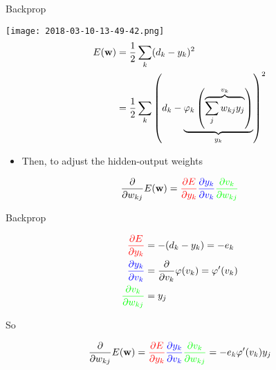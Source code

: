 \documentclass[notes]{beamer}
\providecommand{\tightlist}{%
  \setlength{\itemsep}{0pt}\setlength{\parskip}{0pt}}
\begin{document}
\begin{frame}{Backprop}

\centering 

\texttt{[image: 2018-03-10-13-49-42.png]}\\

\begin{align} 
    E(\vw) & = \frac{1}{2} \sum_k (d_k - y_k)^2 \\ %
      & =  \frac{1}{2}\sum_k \left(
        d_k - \underbrace{\varphi_k 
        \left( \overbrace{\sum_j w_{kj} y_j}^{v_k} \right)
         }_{y_k}
      \right)^2 
\end{align}

\begin{itemize}
\tightlist
\item
  Then, to adjust the hidden-output weights
\end{itemize}

\begin{equation}
    \frac{\partial }{\partial w_{kj}} E(\mathbf{w}) = 
    \textcolor{red}{
        \frac{\partial E}{\partial y_k}} 
    \textcolor{blue}{
        \frac{\partial y_k}{\partial v_k}
    } 
    \textcolor{green}{
        \frac{\partial v_k}{\partial w_{kj}}
    }
\end{equation}

\end{frame}

\begin{frame}{Backprop}

\begin{align}
    \textcolor{red}{
    \frac{\partial E}{\partial y_k}} & = -(d_k - y_k) = -e_k                                           \\
    \textcolor{blue}{
        \frac{\partial y_k}{\partial v_k}
    }                                & = \frac{\partial }{\partial v_k} \varphi (v_k) = \varphi ' (v_k) \\
    \textcolor{green}{
        \frac{\partial v_k}{\partial w_{kj}}
    }                                & = y_j
\end{align}

So

\begin{equation}
  \frac{\partial }{\partial w_{kj}} E(\mathbf{w}) = 
    \textcolor{red}{
        \frac{\partial E}{\partial y_k}} 
    \textcolor{blue}{
        \frac{\partial y_k}{\partial v_k}
    } 
    \textcolor{green}{
        \frac{\partial v_k}{\partial w_{kj}}
    } = -e_k \varphi ' (v_k) y_j 
\end{equation}

\end{frame}
\end{document}

